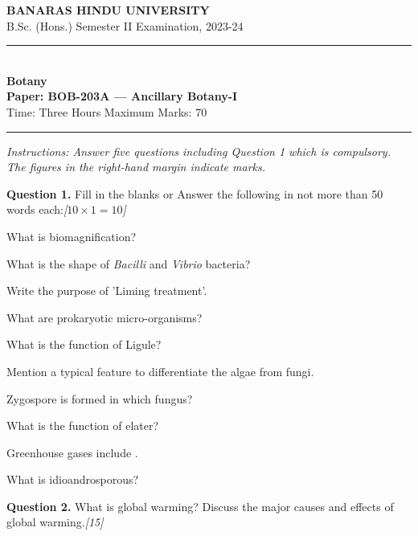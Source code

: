 \documentclass[11pt,a4paper]{article}
\newcommand{\pts}[1]{\hfill   \textit{[#1]}}
\begin{document}
\begin{center}
  {\large\bfseries BANARAS HINDU UNIVERSITY}\\[2pt]
  {\normalsize B.Sc. (Hons.) Semester II Examination, 2023-24}\\[6pt]
  \rule{0.8\linewidth}{0.5pt}\\[6pt]
  {\large\bfseries Botany}\\[4pt]
  {\large\bfseries Paper: BOB-203A --- Ancillary Botany-I}\\[4pt]
  {\normalsize Time: Three Hours \hfill Maximum Marks: 70}
\end{center}

\rule{\linewidth}{0.4pt}

\smallskip



\noindent   \textit{Instructions: Answer five questions including Question 1 which is compulsory. The figures in the right-hand margin indicate marks.}

\bigskip

\medskip


\noindent   \textbf{Question 1.} Fill in the blanks or Answer the following in not more than 50 words each:\pts{$10  \times 1 = 10$}

\begin{parts}
  \item What is biomagnification?
  \item What is the shape of   \textit{Bacilli} and   \textit{Vibrio} bacteria?
  \item Write the purpose of 'Liming treatment'.
  \item What are prokaryotic micro-organisms?
  \item What is the function of Ligule?
  \item Mention a typical feature to differentiate the algae from fungi.
  \item Zygospore is formed in which fungus?
  \item What is the function of elater?
  \item Greenhouse gases include \makebox[3cm]{\hrulefill}.
  \item What is idioandrosporous?
\end{parts}

\medskip


\noindent   \textbf{Question 2.} What is global warming? Discuss the major causes and effects of global warming.\pts{15}

\medskip
\end{document}
